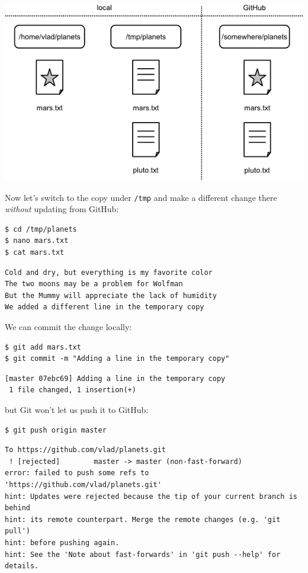 \documentclass{book}
\begin{document}
\includegraphics{novice/git/img/git-after-first-conflicting-change.png}

Now let's switch to the copy under \texttt{/tmp} and make a different
change there \emph{without} updating from GitHub:

\begin{verbatim}
$ cd /tmp/planets
$ nano mars.txt
$ cat mars.txt
\end{verbatim}

\begin{verbatim}
Cold and dry, but everything is my favorite color
The two moons may be a problem for Wolfman
But the Mummy will appreciate the lack of humidity
We added a different line in the temporary copy
\end{verbatim}

We can commit the change locally:

\begin{verbatim}
$ git add mars.txt
$ git commit -m "Adding a line in the temporary copy"
\end{verbatim}

\begin{verbatim}
[master 07ebc69] Adding a line in the temporary copy
 1 file changed, 1 insertion(+)
\end{verbatim}

but Git won't let us push it to GitHub:

\begin{verbatim}
$ git push origin master
\end{verbatim}

\begin{verbatim}
To https://github.com/vlad/planets.git
 ! [rejected]        master -> master (non-fast-forward)
error: failed to push some refs to 'https://github.com/vlad/planets.git'
hint: Updates were rejected because the tip of your current branch is behind
hint: its remote counterpart. Merge the remote changes (e.g. 'git pull')
hint: before pushing again.
hint: See the 'Note about fast-forwards' in 'git push --help' for details.
\end{verbatim}
\end{document}
